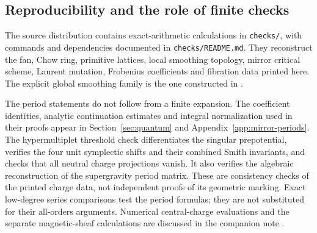 \subsection{Reproducibility and the role of finite checks}

The source distribution contains exact-arithmetic calculations
in \texttt{checks/}, with commands and dependencies documented
in \texttt{checks/README.md}. They reconstruct the fan, Chow
ring, primitive lattices, local smoothing topology, mirror
critical scheme, Laurent mutation, Frobenius coefficients and
fibration data printed here. The explicit global smoothing
family is the one constructed in \cite{Wuebben:2026smoothing}.

The period statements do not follow from a finite expansion.
The coefficient identities, analytic continuation estimates
and integral normalization used in their proofs appear in
Section~\ref{sec:quantum} and Appendix~\ref{app:mirror-periods}.
The hypermultiplet threshold check differentiates the singular
prepotential, verifies the four unit symplectic shifts and their
combined Smith invariants, and checks that all neutral charge
projections vanish. It also verifies the algebraic reconstruction
of the supergravity period matrix. These are consistency checks
of the printed charge data, not independent proofs of its geometric marking.
Exact low-degree series comparisons test the period formulas; they
are not substituted for their all-orders arguments. Numerical
central-charge evaluations and the separate magnetic-sheaf
calculations are discussed in the companion note
\cite{Wuebben:2026magnetic}.
